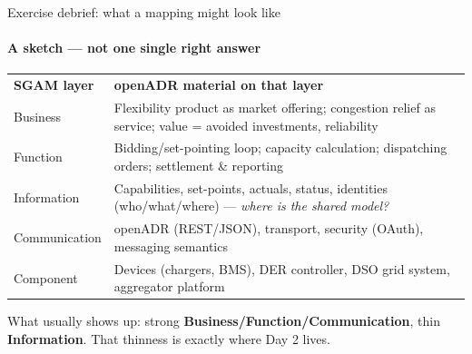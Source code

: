 \begin{frame}{Exercise debrief: what a mapping might look like}
  \framesubtitle{A sketch — not one single right answer}

  \begin{table}
    \begin{tabular}{lp{11cm}}
      \rowcolor[HTML]{dab785}
      {\color{newgray}\textbf{SGAM layer}} & {\color{newgray}\textbf{openADR material on that layer}} \\
      Business & Flexibility product as market offering; congestion relief as service; value = avoided investments, reliability \\
      Function & Bidding/set-pointing loop; capacity calculation; dispatching orders; settlement \& reporting \\
      Information & \alert{Capabilities, set-points, actuals, status, identities (who/what/where)} — \emph{where is the shared model?} \\
      Communication & openADR (REST/JSON), transport, security (OAuth), messaging semantics \\
      Component & Devices (chargers, BMS), DER controller, DSO grid system, aggregator platform \\
    \end{tabular}
  \end{table}

  \vspace{0.2cm}
  \pause
  What usually shows up: strong \textbf{Business/Function/Communication}, thin \textbf{Information}.
  That thinness is exactly where Day 2 lives.
\end{frame}
